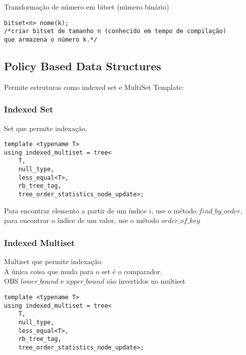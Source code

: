     Transformação de número em bitset (número binário)
    \begin{verbatim}
bitset<n> nome(k); 
/*criar bitset de tamanho n (conhecido em tempo de compilação) 
que armazena o número k.*/
    \end{verbatim}

\subsection{Policy Based Data Structures}

Permite estruturas como indexed set e MultiSet
Template:

\subsubsection{Indexed Set}
Set que permite indexação.

\begin{verbatim}
template <typename T>
using indexed_multiset = tree<
    T,
    null_type,
    less_equal<T>,
    rb_tree_tag,
    tree_order_statistics_node_update>;
\end{verbatim}

Para encontrar elemento a partir de um índice $i$, use o método $find\_by\_order$, 
para encontrar o índice de um valor, use o método $order\_of\_key$
    

\subsubsection{Indexed Multiset}

Multiset que permite indexação.\\
A única coisa que muda para o set é o comparador.\\
OBS $lower\_bound$ e $upper\_bound$ são invertidos no multiset

\begin{verbatim}
template <typename T>
using indexed_multiset = tree<
    T,
    null_type,
    less_equal<T>,
    rb_tree_tag,
    tree_order_statistics_node_update>;
\end{verbatim}

